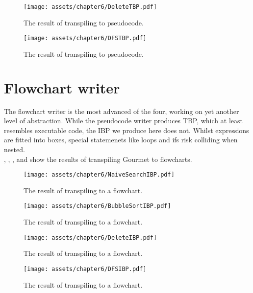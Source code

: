 \begin{figure}[ht!]
    \centering
    \texttt{[image: assets/chapter6/DeleteTBP.pdf]}
    \caption{The result of transpiling  to pseudocode.}
    \label{deleteBSTTBP}
\end{figure}

\begin{figure}[ht!]
    \centering
    \texttt{[image: assets/chapter6/DFSTBP.pdf]}
    \caption{The result of transpiling  to pseudocode.}
    \label{dfsTBP}
\end{figure}

\section{Flowchart writer}

The flowchart writer is the most advanced of the four, working on yet another level of abstraction. While the pseudocode writer produces TBP, which at least resembles executable code, the IBP we produce here does not. Whilst expressions are fitted into boxes, special statemenets like loops and ifs risk colliding when nested. \\

, , , and  show the results of transpiling Gourmet to flowcharts. \\

\begin{figure}[ht!]
    \centering
    \texttt{[image: assets/chapter6/NaiveSearchIBP.pdf]}
    \caption{The result of transpiling  to a flowchart.}
    \label{naiveSearchIBP}
\end{figure}

\begin{figure}[ht!]
    \centering
    \texttt{[image: assets/chapter6/BubbleSortIBP.pdf]}
    \caption{The result of transpiling  to a flowchart.}
    \label{bubbleSortIBP}
\end{figure}

\begin{figure}[ht!]
    \centering
    \texttt{[image: assets/chapter6/DeleteIBP.pdf]}
    \caption{The result of transpiling  to a flowchart.}
    \label{deleteBSTIBP}
\end{figure}

\begin{figure}[ht!]
    \centering
    \texttt{[image: assets/chapter6/DFSIBP.pdf]}
    \caption{The result of transpiling  to a flowchart.}
    \label{dfsIBP}
\end{figure}

